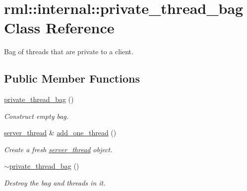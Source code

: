 \hypertarget{classrml_1_1internal_1_1private__thread__bag}{}\section{rml\+:\+:internal\+:\+:private\+\_\+thread\+\_\+bag Class Reference}
\label{classrml_1_1internal_1_1private__thread__bag}


Bag of threads that are private to a client.  


\subsection*{Public Member Functions}
\begin{DoxyCompactItemize}
\item 
\hypertarget{classrml_1_1internal_1_1private__thread__bag_a4c7608ab30071bd0160c720eb5321976}{}\hyperlink{classrml_1_1internal_1_1private__thread__bag_a4c7608ab30071bd0160c720eb5321976}{private\+\_\+thread\+\_\+bag} ()\label{classrml_1_1internal_1_1private__thread__bag_a4c7608ab30071bd0160c720eb5321976}

\begin{DoxyCompactList}\small\item\em Construct empty bag. \end{DoxyCompactList}\item 
\hypertarget{classrml_1_1internal_1_1private__thread__bag_a0b6eacdca94017e6b59c15ae42c623d1}{}\hyperlink{classrml_1_1internal_1_1server__thread}{server\+\_\+thread} \& \hyperlink{classrml_1_1internal_1_1private__thread__bag_a0b6eacdca94017e6b59c15ae42c623d1}{add\+\_\+one\+\_\+thread} ()\label{classrml_1_1internal_1_1private__thread__bag_a0b6eacdca94017e6b59c15ae42c623d1}

\begin{DoxyCompactList}\small\item\em Create a fresh \hyperlink{classrml_1_1internal_1_1server__thread}{server\+\_\+thread} object. \end{DoxyCompactList}\item 
\hypertarget{classrml_1_1internal_1_1private__thread__bag_a9f65d14fee36f9c6ac2993b7d8800c28}{}\hyperlink{classrml_1_1internal_1_1private__thread__bag_a9f65d14fee36f9c6ac2993b7d8800c28}{$\sim$private\+\_\+thread\+\_\+bag} ()\label{classrml_1_1internal_1_1private__thread__bag_a9f65d14fee36f9c6ac2993b7d8800c28}

\begin{DoxyCompactList}\small\item\em Destroy the bag and threads in it. \end{DoxyCompactList}\end{DoxyCompactItemize}


